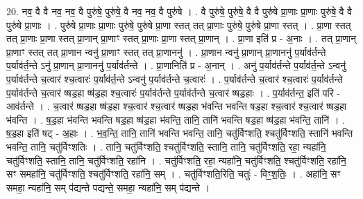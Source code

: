 \documentclass[17pt]{extarticle}
\begin{document}
20. नव॒ वै वै नव॒ नव॒ वै पुरु॑षे॒ पुरु॑षे॒ वै नव॒ नव॒ वै पुरु॑षे । . वै पुरु॑षे॒ पुरु॑षे॒ वै वै पुरु॑षे प्रा॒णाः प्रा॒णाः पुरु॑षे॒ वै वै पुरु॑षे प्रा॒णाः । . पुरु॑षे प्रा॒णाः प्रा॒णाः पुरु॑षे॒ पुरु॑षे प्रा॒णा स्तत् तत् प्रा॒णाः पुरु॑षे॒ पुरु॑षे प्रा॒णा स्तत् । . प्रा॒णा स्तत् तत् प्रा॒णाः प्रा॒णा स्तत् प्रा॒णान् प्रा॒णाꣳ स्तत् प्रा॒णाः प्रा॒णा स्तत् प्रा॒णान् । . प्रा॒णा इति॑ प्र - अ॒नाः । . तत् प्रा॒णान् प्रा॒णाꣳ स्तत् तत् प्रा॒णान न्वनु॑ प्रा॒णाꣳ स्तत् तत् प्रा॒णाननु॑ । . प्रा॒णान न्वनु॑ प्रा॒णान् प्रा॒णाननु॑ प॒र्याव॑र्तन्ते प॒र्याव॑र्त॒न्ते ऽनु॑ प्रा॒णान् प्रा॒णाननु॑ प॒र्याव॑र्तन्ते । . प्रा॒णानिति॑ प्र - अ॒नान् । . अनु॑ प॒र्याव॑र्तन्ते प॒र्याव॑र्त॒न्ते ऽन्वनु॑ प॒र्याव॑र्तन्ते च॒त्वार॑ श्च॒त्वारः॑ प॒र्याव॑र्त॒न्ते ऽन्वनु॑ प॒र्याव॑र्तन्ते च॒त्वारः॑ । . प॒र्याव॑र्तन्ते च॒त्वार॑ श्च॒त्वारः॑ प॒र्याव॑र्तन्ते प॒र्याव॑र्तन्ते च॒त्वार॑ ष्षड॒हा ष्ष॑ड॒हा श्च॒त्वारः॑ प॒र्याव॑र्तन्ते प॒र्याव॑र्तन्ते च॒त्वार॑ ष्षड॒हाः । . प॒र्याव॑र्तन्त॒ इति॑ परि - आव॑र्तन्ते । . च॒त्वार॑ ष्षड॒हा ष्ष॑ड॒हा श्च॒त्वार॑ श्च॒त्वार॑ ष्षड॒हा भ॑वन्ति भवन्ति षड॒हा श्च॒त्वार॑ श्च॒त्वार॑ ष्षड॒हा भ॑वन्ति । . ष॒ड॒हा भ॑वन्ति भवन्ति षड॒हा ष्ष॑ड॒हा भ॑वन्ति॒ तानि॒ तानि॑ भवन्ति षड॒हा ष्ष॑ड॒हा भ॑वन्ति॒ तानि॑ । . ष॒ड॒हा इति॑ षट् - अ॒हाः । . भ॒व॒न्ति॒ तानि॒ तानि॑ भवन्ति भवन्ति॒ तानि॒ चतु॑र्विꣳशति॒ श्चतु॑र्विꣳशति॒ स्तानि॑ भवन्ति भवन्ति॒ तानि॒ चतु॑र्विꣳशतिः । . तानि॒ चतु॑र्विꣳशति॒ श्चतु॑र्विꣳशति॒ स्तानि॒ तानि॒ चतु॑र्विꣳशति॒ रहा॒ न्यहा॑नि॒ चतु॑र्विꣳशति॒ स्तानि॒ तानि॒ चतु॑र्विꣳशति॒ रहा॑नि । . चतु॑र्विꣳशति॒ रहा॒ न्यहा॑नि॒ चतु॑र्विꣳशति॒ श्चतु॑र्विꣳशति॒ रहा॑नि॒ सꣳ समहा॑नि॒ चतु॑र्विꣳशति॒ श्चतु॑र्विꣳशति॒ रहा॑नि॒ सम् । . चतु॑र्विꣳशति॒रिति॒ चतुः॑ - विꣳ॒॒श॒तिः॒ । . अहा॑नि॒ सꣳ समहा॒ न्यहा॑नि॒ सम् प॑द्यन्ते पद्यन्ते॒ समहा॒ न्यहा॑नि॒ सम् प॑द्यन्ते । \newline
\end{document}
